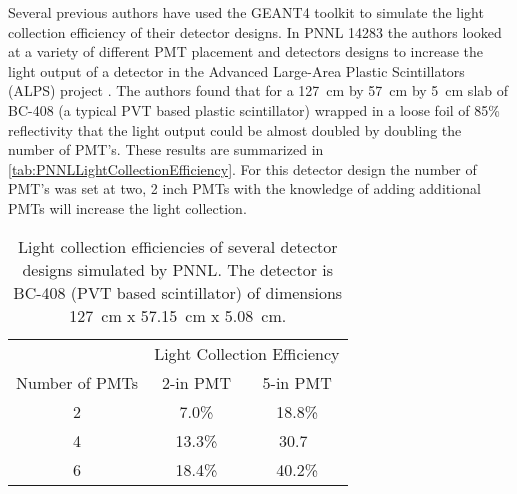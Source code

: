 Several previous authors have used the GEANT4 toolkit to simulate the light collection efficiency of their detector designs.
In PNNL 14283 the authors looked at a variety of different PMT placement and detectors designs to increase the light output of a detector in the Advanced Large-Area Plastic Scintillators (ALPS) project \cite{pnnl_14283}.
The authors found that for a \SI{127}{\cm} by \SI{57}{\cm} by \SI{5}{\cm} slab of BC-408 (a typical PVT based plastic scintillator) wrapped in a loose foil of 85\% reflectivity that the light output could be almost doubled by doubling the number of PMT's.
These results are summarized in \autoref{tab:PNNLLightCollectionEfficiency}. 
For this detector design the number of PMT's was set at two, 2 inch PMTs with the knowledge of adding additional PMTs will increase the light collection.
\begin{table}
  \centering
  \caption[PNNL Light Collection Efficiencies]{Light collection efficiencies of several detector designs simulated by PNNL\cite{pnnl_14283}. The detector is BC-408 (PVT based scintillator) of dimensions \SI{127}{\cm} x \SI{57.15}{\cm} x \SI{5.08}{\cm}.}
  \label{tab:PNNLLightCollectionEfficiency}
  \begin{tabular}{c|c c}
  \toprule
  & \multicolumn{2}{c}{Light Collection Efficiency} \\
  Number of PMTs  & 2-in PMT & 5-in PMT \\
  \midrule
  2 & 7.0\% & 18.8\% \\
  4 & 13.3\% & 30.7\ \\
  6 & 18.4\% & 40.2\% \\
  \bottomrule
  \end{tabular}
\end{table}

